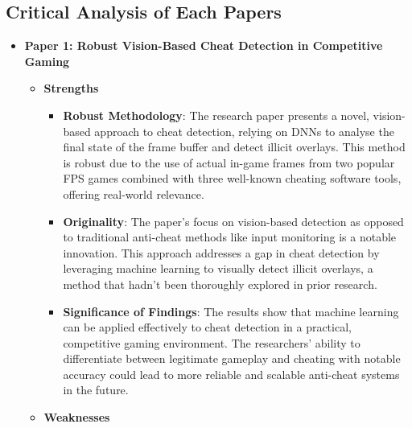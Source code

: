 \documentclass[a4paper, 12pt]{article}
\begin{document}
\subsection{Critical Analysis of Each Papers}
\begin{itemize}
    \item \textbf{Paper 1: Robust Vision-Based Cheat Detection in Competitive Gaming} 
    \begin{itemize}
        \item \textbf{Strengths}
        \begin{itemize}
            \item \textbf{Robust Methodology}: The research paper presents a novel, vision-based approach to cheat detection, relying on DNNs to analyse the final state of the frame buffer and detect illicit overlays. This method is robust due to the use of actual in-game frames from two popular FPS games combined with three well-known cheating software tools, offering real-world relevance.
            \item \textbf{Originality}: The paper’s focus on vision-based detection as opposed to traditional anti-cheat methods like input monitoring is a notable innovation. This approach addresses a gap in cheat detection by leveraging machine learning to visually detect illicit overlays, a method that hadn’t been thoroughly explored in prior research.
            \item \textbf{Significance of Findings}: The results show that machine learning can be applied effectively to cheat detection in a practical, competitive gaming environment. The researchers’ ability to differentiate between legitimate gameplay and cheating with notable accuracy could lead to more reliable and scalable anti-cheat systems in the future.
        \end{itemize}

        \item \textbf{Weaknesses}


\end{itemize}
\end{itemize}
\end{document}
